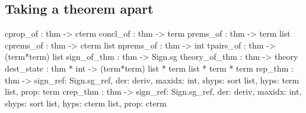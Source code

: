 \subsection{Taking a theorem apart}
\begin{ttbox} 
cprop_of      : thm -> cterm
concl_of      : thm -> term
prems_of      : thm -> term list
cprems_of     : thm -> cterm list
nprems_of     : thm -> int
tpairs_of     : thm -> (term*term) list
sign_of_thm   : thm -> Sign.sg
theory_of_thm : thm -> theory
dest_state    : thm * int -> (term*term) list * term list * term * term
rep_thm       : thm -> {\ttlbrace}sign_ref: Sign.sg_ref, der: deriv, maxidx: int,
                        shyps: sort list, hyps: term list, prop: term\ttrbrace
crep_thm      : thm -> {\ttlbrace}sign_ref: Sign.sg_ref, der: deriv, maxidx: int,
                        shyps: sort list, hyps: cterm list, prop: cterm\ttrbrace
\end{ttbox}

